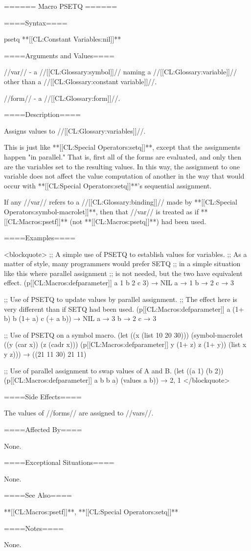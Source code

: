 ====== Macro PSETQ ======

====Syntax====

\DefmacWithValues psetq {} {**[[CL:Constant Variables:nil]]**}


====Arguments and Values====

//var// - a //[[CL:Glossary:symbol]]// naming a //[[CL:Glossary:variable]]// other than a //[[CL:Glossary:constant variable]]//.

//form// - a //[[CL:Glossary:form]]//.

====Description====

Assigns values to //[[CL:Glossary:variables]]//.

This is just like **[[CL:Special Operators:setq]]**, except that the assignments happen "in parallel." That is, first all of the forms are evaluated, and only then are the variables set to the resulting values. In this way, the assignment to one variable does not affect the value computation of another in the way that would occur with **[[CL:Special Operators:setq]]**'s sequential assignment.

If any //var// refers to a //[[CL:Glossary:binding]]// made by **[[CL:Special Operators:symbol-macrolet]]**, then that //var// is treated as if **[[CL:Macros:psetf]]** (not **[[CL:Macros:psetq]]**) had been used.

====Examples====

<blockquote> ;; A simple use of PSETQ to establish values for variables. ;; As a matter of style, many programmers would prefer SETQ ;; in a simple situation like this where parallel assignment ;; is not needed, but the two have equivalent effect. (p[[CL:Macros:defparameter]] a 1 b 2 c 3) → NIL a → 1 b → 2 c → 3

;; Use of PSETQ to update values by parallel assignment. ;; The effect here is very different than if SETQ had been used. (p[[CL:Macros:defparameter]] a (1+ b) b (1+ a) c (+ a b)) → NIL a → 3 b → 2 c → 3

;; Use of PSETQ on a symbol macro. (let ((x (list 10 20 30))) (symbol-macrolet ((y (car x)) (z (cadr x))) (p[[CL:Macros:defparameter]] y (1+ z) z (1+ y)) (list x y z))) → ((21 11 30) 21 11)

;; Use of parallel assignment to swap values of A and B. (let ((a 1) (b 2)) (p[[CL:Macros:defparameter]] a b b a) (values a b)) → 2, 1 </blockquote>

====Side Effects====

The values of //forms// are assigned to //vars//.

====Affected By====

None.

====Exceptional Situations====

None.

====See Also====

**[[CL:Macros:psetf]]**, **[[CL:Special Operators:setq]]**

====Notes====

None.

